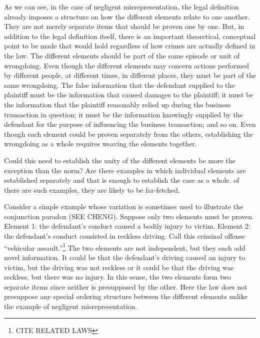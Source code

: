 \documentclass[
  10pt,
  dvipsnames,enabledeprecatedfontcommands]{scrartcl}
\begin{document}
As we can see, in the case of negligent misrepresentation, the legal
definition already imposes a structure on how the different elements
relate to one another. They are not merely separate items that should be
proven one by one. But, in addition to the legal definition itself,
there is an important theoretical, conceptual point to be made that
would hold regardless of how crimes are actually defined in the law. The
different elements should be part of the same episode or unit of
wrongdoing. Even though the different elements may concern actions
performed by different people, at different times, in different places,
they must be part of the same wrongdoing. The false information that the
defendant supplied to the plaintiff must be the information that caused
damages to the plaintiff; it must be the information that the plaintiff
reasonably relied up during the business transaction in question; it
must be the information knowingly supplied by the defendant for the
purpose of influencing the business transaction; and so on. Even though
each element could be proven separately from the others, establishing
the wrongdoing as a whole requires weaving the elements together.

Could this need to establish the unity of the different elements be more
the exception than the norm? Are there examples in which individual
elements are established separately and that is enough to establish the
case as a whole. of there are such examples, they are likely to be
far-fetched.

Consider a simple example whose variation is sometimes used to
illustrate the conjunction paradox (SEE CHENG). Suppose only two
elements must be proven. Element 1: the defendant's conduct caused a
bodily injury to victim. Element 2: the defendant's conduct consisted in
reckless driving. Call this criminal offense ``vehicular
assault.''\footnote{CITE RELATED LAWS} The two elements are not
independent, but they each add novel information. It could be that the
defendant's driving caused an injury to victim, but the driving was not
reckless or it could be that the driving was reckless, but there was no
injury. In this sense, the two elements form two separate items since
neither is presupposed by the other. Here the law does not presuppose
any special ordering structure between the different elements unlike the
example of negligent misrepresentation.
\end{document}

